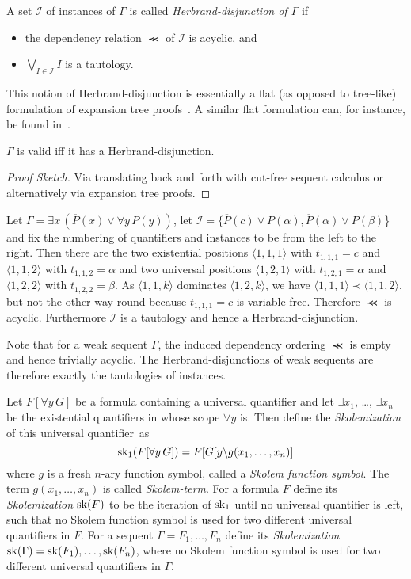 \documentclass{LMCS}
\theoremstyle{plain}
\theoremstyle{definition}
\def\cI{{\mathcal I}}
\def\set#1{\{#1\}}
\def\wcneg#1{\overline{#1}}
\newcommand{\sop}{[}
\newcommand{\scl}{]}
\newcommand{\sel}[2]{#1 \backslash #2}
\newcommand{\unsubst}[2]{\sop \sel{#1}{#2} \scl}
\newcommand{\dual}[1]{\wcneg{#1}}
\newcommand{\Lor}{\bigvee}
\newcommand{\deprelz}{\prec}
\newcommand{\deprel}{\llcurly}
\begin{document}
\begin{defi}
  A set $\cI$ of instances of $\Gamma$ is called
  \emph{Herbrand-disjunction of $\Gamma$} if
  \begin{itemize}
  \item the dependency relation $\deprel$ of $\cI$ is acyclic, and
  \item $\displaystyle\Lor_{I\in\cI} I$ is a tautology.
  \end{itemize}
\end{defi}

This notion of Herbrand-disjunction is essentially a flat (as opposed to tree-like)
formulation of expansion tree proofs~\cite{Miller87Compact}. A similar flat formulation
can, for instance, be found in~\cite{Baaz94Skolemization}.

\begin{theorem}
$\Gamma$ is valid iff it has a Herbrand-disjunction.
\end{theorem}
\begin{proof}[Proof Sketch]
Via translating back and forth with cut-free sequent calculus or alternatively via
expansion tree proofs.
\end{proof}
\begin{exa}\label{ex.drinker}
Let $\Gamma = \exists x\, (\dual{P}(x) \lor \forall y\, P(y))$, let
$\cI =\set{\dual{P}(c)\lor P(\alpha), \dual{P}(\alpha)\lor P(\beta)$} and
fix the numbering of quantifiers and instances to be from the left to the
right. Then there are the two existential positions $\langle 1, 1, 1\rangle$
with $t_{1,1,1} = c$ and $\langle 1,1,2 \rangle$ with $t_{1,1,2} = \alpha$
and two universal positions $\langle 1,2,1 \rangle$ with $t_{1,2,1} = \alpha$
and $\langle 1,2,2\rangle$ with $t_{1,2,2} = \beta$. As $\langle 1,1,k \rangle$
dominates $\langle 1,2,k \rangle$, we have $\langle 1,1,1 \rangle \deprelz \langle 1,1,2\rangle$,
but not the other way round because $t_{1,1,1} = c$ is variable-free. Therefore
$\deprel$ is acyclic. Furthermore $\cI$ is a tautology and hence a Herbrand-disjunction.
\end{exa}
Note that for a weak sequent $\Gamma$, the induced dependency ordering $\deprel$ is empty and
hence trivially acyclic. The Herbrand-disjunctions of weak sequents are therefore exactly
the tautologies of instances.
\begin{defi}
Let $F[\forall y\, G]$ be a formula containing a universal quantifier
and let $\exists x_1$, \ldots, $\exists x_n$ be the existential quantifiers in whose scope
$\forall y$ is. Then define the \emph{Skolemization} of this universal quantifier~as
\[
\sk_1(F[\forall y\, G]) = F[G\unsubst{y}{g(x_1,\ldots,x_n)}
\]
where $g$ is a fresh $n$-ary function symbol, called a {\em Skolem
  function symbol}.  The term $g(x_1,\ldots,x_n)$ is called
\emph{Skolem-term}.  For a formula $F$ define its \emph{Skolemization
  $\sk(F)$} to be the iteration of $\sk_1$ until no universal
quantifier is left, such that no Skolem function symbol is used for
two different universal quantifiers in $F$. For a sequent $\Gamma =
F_1,\ldots,F_n$ define its \emph{Skolemization $\sk(\Gamma) =
  \sk(F_1),\ldots,\sk(F_n)$}, where no Skolem function symbol is used
for two different universal quantifiers in $\Gamma$.
\end{defi}
\end{document}

